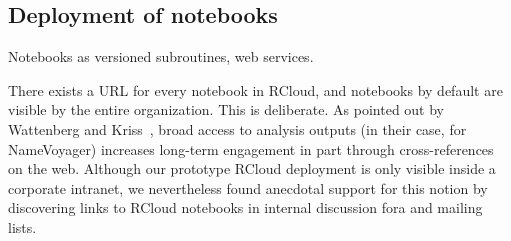 \subsection{Deployment of notebooks\label{sec:deployment}}

Notebooks as versioned subroutines, web services.

There exists a URL for every notebook in RCloud, and notebooks by
default are visible by the entire organization. This is deliberate.
As pointed out by Wattenberg and Kriss~\cite{Wattenberg:2011:DFS},
broad access to analysis outputs (in their case, for NameVoyager)
increases long-term engagement in part through cross-references on
the web. Although our prototype RCloud deployment is only visible
inside a corporate intranet, we nevertheless found anecdotal support
for this notion by discovering links to RCloud notebooks in internal
discussion fora and mailing lists.
